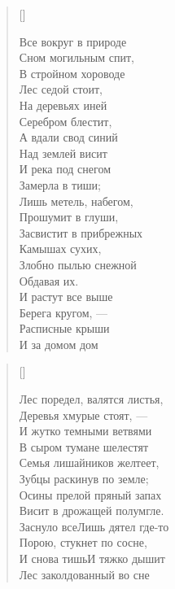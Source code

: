 \newpage
\vspace*{0cm}


\settowidth{\versewidth}{Злобно пылью снежной}
\begin{verse}[\versewidth]
\begin{altverse}
Все вокруг в природе\\
Сном могильным спит,\\
В стройном хороводе\\
Лес седой стоит,\\
На деревьях иней\\
Серебром блестит,\\
А вдали свод синий\\
Над землей висит\ldotst\\
И река под снегом\\
Замерла в тиши;\\
Лишь метель, набегом,\\
Прошумит в глуши,\\
Засвистит в прибрежных\\
Камышах сухих,\\
Злобно пылью снежной\\
Обдавая их.\\
И растут все выше\\
Берега кругом, --- \\
Расписные крыши\\
И за домом дом\ldotst
\end{altverse}
\end{verse}

\newpage
\vspace*{0cm}


\settowidth{\versewidth}{Лес поредел, валятся листья...}
\begin{verse}[\versewidth]
\begin{altverse}
Лес поредел, валятся листья,\\
Деревья хмурые стоят, ---\\
И жутко темными ветвями\\
В сыром тумане шелестят\ldotst\\
Семья лишайников желтеет,\\
Зубцы раскинув по земле;\\
Осины прелой пряный запах\\
Висит в дрожащей полумгле.\\
Заснуло все\ldotst Лишь дятел где-то\\
Порою, стукнет по сосне,\\
И снова тишь\ldotst И тяжко дышит\\
Лес заколдованный во сне\ldotst
\end{altverse}
\end{verse}

